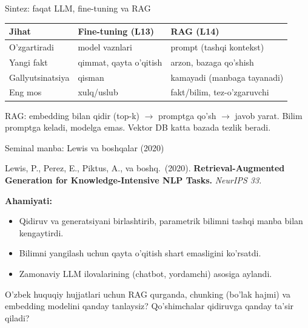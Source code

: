 \documentclass[aspectratio=169,11pt]{beamer}
\begin{document}
\begin{frame}{Sintez: faqat LLM, fine-tuning va RAG}
  \begin{center}\small
  \begin{tabular}{p{3.0cm}p{3.4cm}p{4.2cm}}
    \toprule
    \textbf{Jihat} & \textbf{Fine-tuning (L13)} & \textbf{RAG (L14)} \\
    \midrule
    O'zgartiradi & model vaznlari & prompt (tashqi kontekst) \\
    Yangi fakt & qimmat, qayta o'qitish & arzon, bazaga qo'shish \\
    Gallyutsinatsiya & qisman & kamayadi (manbaga tayanadi) \\
    Eng mos & xulq/uslub & fakt/bilim, tez-o'zgaruvchi \\
    \bottomrule
  \end{tabular}
  \end{center}
  \vspace{4pt}
  \begin{tcolorbox}[okbox,title=Asosiy g'oya,top=2pt,bottom=2pt]
    \footnotesize
    RAG: embedding bilan qidir (top-k) $\to$ promptga qo'sh $\to$ javob yarat.
    Bilim promptga keladi, modelga emas. Vektor DB katta bazada tezlik beradi.
  \end{tcolorbox}
\end{frame}

\begin{frame}{Seminal manba: Lewis va boshqalar (2020)}
  \begin{tcolorbox}[defbox,title=Manba]
    \small
    Lewis, P., Perez, E., Piktus, A., va boshq.\ (2020). \textbf{Retrieval-Augmented
    Generation for Knowledge-Intensive NLP Tasks.} \textit{NeurIPS 33.}
  \end{tcolorbox}
  \vspace{5pt}
  \textbf{Ahamiyati:}
  \begin{itemize}\small\setlength\itemsep{3pt}
    \item Qidiruv va generatsiyani birlashtirib, parametrik bilimni tashqi
          manba bilan kengaytirdi.
    \item Bilimni yangilash uchun qayta o'qitish shart emasligini ko'rsatdi.
    \item Zamonaviy LLM ilovalarining (chatbot, yordamchi) asosiga aylandi.
  \end{itemize}
  \vspace{5pt}
  \begin{tcolorbox}[warnbox,title=Muhokama savoli (P14 gacha o'ylang)]
    \small
    O'zbek huquqiy hujjatlari uchun RAG qurganda, chunking (bo'lak hajmi) va
    embedding modelini qanday tanlaysiz? Qo'shimchalar qidiruvga qanday ta'sir qiladi?
  \end{tcolorbox}
\end{frame}
\end{document}
